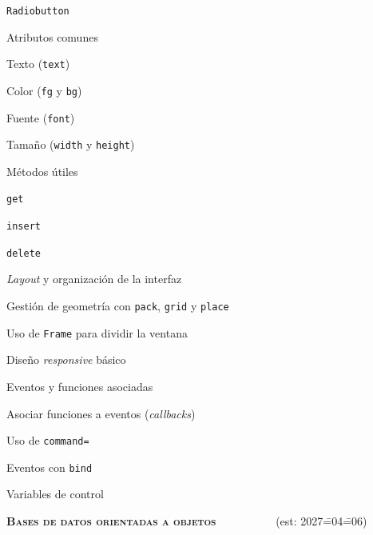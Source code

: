 \begin{longenum}
\begin{longenum}
\begin{longenum}
            \item \texttt{Radiobutton}
            \item Atributos comunes
            \begin{longenum}
                \item Texto (\texttt{text})
                \item Color (\texttt{fg} y \texttt{bg})
                \item Fuente (\texttt{font})
                \item Tamaño (\texttt{width} y \texttt{height})
            \end{longenum}
            \item Métodos útiles
            \begin{longenum}
                \item \texttt{get}
                \item \texttt{insert}
                \item \texttt{delete}
            \end{longenum}
        \end{longenum}
        \item \textit{Layout} y organización de la interfaz
        \begin{longenum}
            \item Gestión de geometría con \texttt{pack}, \texttt{grid} y \texttt{place}
            \item Uso de \texttt{Frame} para dividir la ventana
            \item Diseño \textit{responsive} básico
        \end{longenum}
        \item Eventos y funciones asociadas
        \begin{longenum}
            \item Asociar funciones a eventos (\textit{callbacks})
            \begin{longenum}
                \item Uso de \texttt{command=}
                \item Eventos con \texttt{bind}
            \end{longenum}
            \item Variables de control
        \end{longenum}
    \end{longenum}
    \item \textbf{\textsc{Bases de datos orientadas a objetos}} \ \ \ \ \ \ \ \ \ \ (est: 2027\==04\==06)

\end{longenum}
